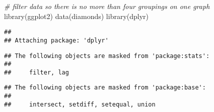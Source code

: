 \documentclass[
]{article}
\newenvironment{Shaded}{\begin{snugshade}}{\end{snugshade}}
\newcommand{\CommentTok}[1]{\textcolor[rgb]{0.56,0.35,0.01}{\textit{#1}}}
\newcommand{\FunctionTok}[1]{\textcolor[rgb]{0.00,0.00,0.00}{#1}}
\newcommand{\NormalTok}[1]{#1}
\begin{document}
\begin{Shaded}
\begin{Highlighting}[]
\CommentTok{\# filter data so there is no more than four groupings on one graph}
\FunctionTok{library}\NormalTok{(ggplot2)}
\FunctionTok{data}\NormalTok{(diamonds)}
\FunctionTok{library}\NormalTok{(dplyr)}
\end{Highlighting}
\end{Shaded}

\begin{verbatim}
## 
## Attaching package: 'dplyr'
\end{verbatim}

\begin{verbatim}
## The following objects are masked from 'package:stats':
## 
##     filter, lag
\end{verbatim}

\begin{verbatim}
## The following objects are masked from 'package:base':
## 
##     intersect, setdiff, setequal, union
\end{verbatim}
\end{document}
